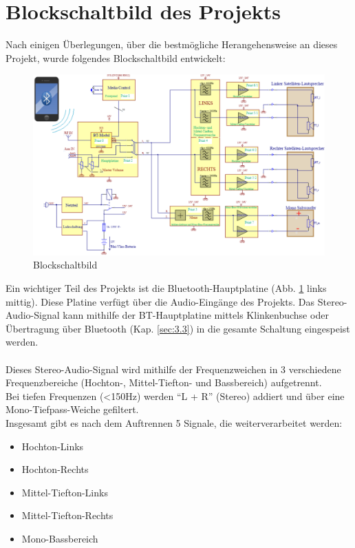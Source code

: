\section{Blockschaltbild des Projekts}\label{sec:3.1}
Nach einigen Überlegungen, über die bestmögliche Herangehensweise an dieses Projekt, wurde folgendes Blockschaltbild entwickelt:
\begin{figure} [H]
	\centering
	\includegraphics[width=1\textwidth]{img/blockschaltbildV2.png}
	\caption{Blockschaltbild}
	\label{fig:3.1.1}
\end{figure}
Ein wichtiger Teil des Projekts ist die Bluetooth-Hauptplatine (Abb. \ref{fig:3.1.1} links mittig).
Diese Platine verfügt über die Audio-Eingänge des Projekts.
Das Stereo-Audio-Signal kann mithilfe der BT-Hauptplatine mittels Klinkenbuchse oder Übertragung über Bluetooth (Kap. \ref{sec:3.3}) in die gesamte Schaltung eingespeist werden.
\\ \\
Dieses Stereo-Audio-Signal wird mithilfe der Frequenzweichen in 3 verschiedene Frequenzbereiche (Hochton-, Mittel-Tiefton- und Bassbereich) aufgetrennt.
\\
Bei tiefen Frequenzen (<150Hz) werden \enquote{L + R} (Stereo) addiert und über eine Mono-Tiefpass-Weiche gefiltert.
\\
Insgesamt gibt es nach dem Auftrennen 5 Signale, die weiterverarbeitet werden:
\\ 
\begin{itemize}
	\item Hochton-Links
	\item Hochton-Rechts
	\item Mittel-Tiefton-Links
	\item Mittel-Tiefton-Rechts
	\item Mono-Bassbereich
\end{itemize}

